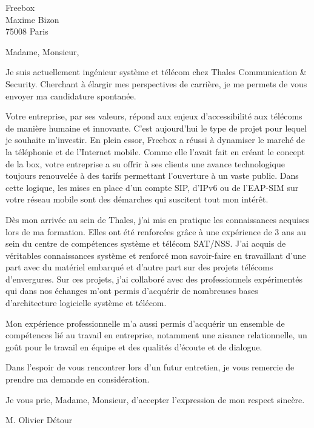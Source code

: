 \documentclass[12pt]{letter}
\def\companyname{Freebox}
\def\companyservice{Maxime Bizon}
\def\companyzip{75008}
\def\companycity{Paris}
\begin{document}
  \begin{letter}{\companyname \\ \companyservice \\ \companyzip{} \companycity}
    \opening{Madame, Monsieur,}

      \indent Je suis actuellement ingénieur système et télécom chez Thales Communication
      \& Security. Cherchant \`a élargir mes perspectives de carrière, je me permets de vous
      envoyer ma candidature spontanée.
      
      \indent Votre entreprise, par ses valeurs, répond aux enjeux d'accessibilité aux
      télécoms de manière humaine et innovante. C'est aujourd'hui le type de projet pour
      lequel je souhaite m'investir. En plein essor, Freebox a réussi à dynamiser le marché
      de la téléphonie et de l'Internet mobile. Comme elle l'avait fait en créant le concept
      de la box, votre entreprise a su offrir à ses clients une avance technologique toujours
      renouvelée à des tarifs permettant l'ouverture à un vaste public. Dans cette logique,
      les mises en place d'un compte SIP, d'IPv6 ou de l'EAP-SIM sur votre réseau mobile
      sont des démarches qui suscitent tout mon intérêt.

      \indent Dès mon arrivée au sein de Thales, j'ai mis en pratique les connaissances
      acquises lors de ma formation. Elles ont été renforcées grâce \`a une expérience
      de 3 ans au sein du centre de compétences système et télécom SAT/NSS.  J'ai acquis
      de véritables connaissances système et renforcé mon savoir-faire en travaillant
      d'une part avec du matériel embarqué et d'autre part sur des projets télécoms
      d'envergures. Sur ces projets, j'ai collaboré avec des professionnels expérimentés
      qui dans nos échanges m'ont permis d'acquérir de nombreuses bases d'architecture
      logicielle système et télécom.

      \indent Mon expérience professionnelle m'a aussi permis d'acquérir un ensemble de
      compétences lié au travail en entreprise, notamment une aisance relationnelle, un
      goût pour le travail en équipe et des qualités d'écoute et de dialogue.

      \indent Dans l'espoir de vous rencontrer lors d'un futur entretien, je vous remercie
      de prendre ma demande en considération.
      
      \indent Je vous prie, Madame, Monsieur, d'accepter l'expression de mon respect sincère.


    \closing{M. Olivier D\'etour}

  \end{letter}
\end{document}

